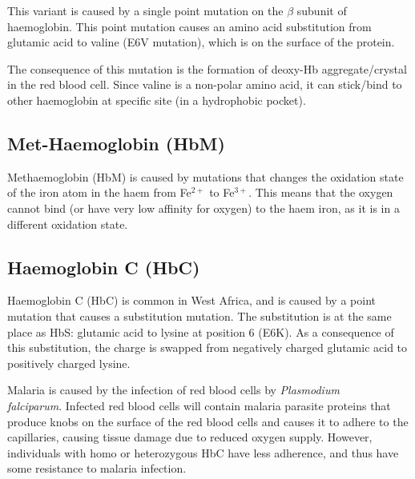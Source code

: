 This variant is caused by a single point mutation on the $\beta$ subunit of haemoglobin.
This point mutation causes an amino acid substitution from glutamic acid to valine (E6V mutation), which is on the surface of the protein.

The consequence of this mutation is the formation of deoxy-Hb aggregate/crystal in the red blood cell.
Since valine is a non-polar amino acid, it can stick/bind to other haemoglobin at specific site (in a hydrophobic pocket).

\subsection{Met-Haemoglobin (HbM)}

Methaemoglobin (HbM) is caused by mutations that changes the oxidation state of the iron atom in the haem from Fe$^{2+}$ to Fe$^{3+}$.
This means that the oxygen cannot bind (or have very low affinity for oxygen) to the haem iron, as it is in a different oxidation state.

\subsection{Haemoglobin C (HbC)}

Haemoglobin C (HbC) is common in West Africa, and is caused by a point mutation that causes a substitution mutation.
The substitution is at the same place as HbS: glutamic acid to lysine at position 6 (E6K).
As a consequence of this substitution, the charge is swapped from negatively charged glutamic acid to positively charged lysine.

Malaria is caused by the infection of red blood cells by \textit{Plasmodium \\falciparum}.
Infected red blood cells will contain malaria parasite proteins that produce knobs on the surface of the red blood cells and causes it to adhere to the capillaries, causing tissue damage due to reduced oxygen supply.
However, individuals with homo or heterozygous HbC have less adherence, and thus have some resistance to malaria infection.





